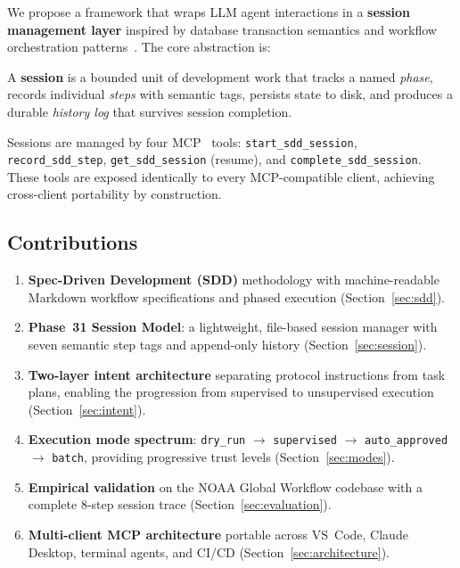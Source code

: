 \documentclass[11pt,letterpaper]{article}
\begin{document}
We propose a framework that wraps LLM agent interactions in a
\textbf{session management layer} inspired by database transaction
semantics and workflow orchestration patterns~\cite{vanderaalst2004workflow}.
The core abstraction is:

\begin{definition}[Session]
A \textbf{session} is a bounded unit of development work that tracks a
named \emph{phase}, records individual \emph{steps} with semantic tags,
persists state to disk, and produces a durable \emph{history log} that
survives session completion.
\end{definition}

Sessions are managed by four MCP~\cite{anthropic2024mcp} tools:
\texttt{start\_sdd\_session}, \texttt{record\_sdd\_step},
\texttt{get\_sdd\_session} (resume), and \texttt{complete\_sdd\_session}.
These tools are exposed identically to every MCP-compatible client,
achieving cross-client portability by construction.

\subsection{Contributions}

\begin{enumerate}[nosep]
    \item \textbf{Spec-Driven Development (SDD)} methodology with
          machine-readable Markdown workflow specifications and phased
          execution (Section~\ref{sec:sdd}).
    \item \textbf{Phase~31 Session Model}: a lightweight, file-based
          session manager with seven semantic step tags and append-only
          history (Section~\ref{sec:session}).
    \item \textbf{Two-layer intent architecture} separating protocol
          instructions from task plans, enabling the progression from
          supervised to unsupervised execution
          (Section~\ref{sec:intent}).
    \item \textbf{Execution mode spectrum}: \texttt{dry\_run} $\to$
          \texttt{supervised} $\to$ \texttt{auto\_approved} $\to$
          \texttt{batch}, providing progressive trust levels
          (Section~\ref{sec:modes}).
    \item \textbf{Empirical validation} on the NOAA Global Workflow
          codebase with a complete 8-step session trace
          (Section~\ref{sec:evaluation}).
    \item \textbf{Multi-client MCP architecture} portable across
          VS~Code, Claude Desktop, terminal agents, and CI/CD
          (Section~\ref{sec:architecture}).
\end{enumerate}
\end{document}
